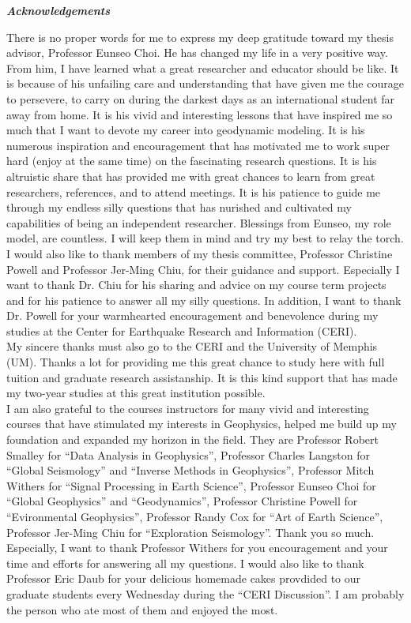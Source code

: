 \begin{center}
\textbf{\textit{Acknowledgements}}
\end{center}

There is no proper words for me to express my deep gratitude toward my thesis advisor, Professor Eunseo Choi. He has changed my life in a very positive way. From him, I have learned what a great researcher and educator should be like. It is because of his unfailing care and understanding that have given me the courage to persevere, to carry on during the darkest days as an international student far away from home. It is his vivid and interesting lessons that have inspired me so much that I want to devote my career into geodynamic modeling. It is his numerous inspiration and encouragement that has motivated me to work super hard (enjoy at the same time) on the fascinating research questions. It is his altruistic share that has provided me with great chances to learn from great researchers, references, and to attend meetings. It is his patience to guide me through my endless silly questions that has nurished and cultivated my capabilities of being an independent researcher. Blessings from Eunseo, my role model, are countless. I will keep them in mind and try my best to relay the torch.
\\
I would also like to thank members of my thesis committee, Professor Christine Powell and Professor Jer-Ming Chiu, for their guidance and support. Especially I want to thank Dr. Chiu for his sharing and advice on my course term projects and for his patience to answer all my silly questions. In addition, I want to thank Dr. Powell for your warmhearted encouragement and benevolence during my studies at the Center for Earthquake Research and Information (CERI). 
\\
My sincere thanks must also go to the CERI and the University of Memphis (UM). Thanks a lot for providing me this great chance to study here with full tuition and graduate research assistanship. It is this kind support that has made my two-year studies at this great institution possible. 
\\
I am also grateful to the courses instructors for many vivid and interesting courses that have stimulated my interests in Geophysics, helped me build up my foundation and expanded my horizon in the field. They are Professor Robert Smalley for ``Data Analysis in Geophysics'', Professor Charles Langston for ``Global Seismology'' and ``Inverse Methods in Geophysics'', Professor Mitch Withers for ``Signal Processing in Earth Science'', Professor Eunseo Choi for ``Global Geophysics'' and ``Geodynamics'', Professor Christine Powell for ``Evironmental Geophysics'', Professor Randy Cox for ``Art of Earth Science'', Professor Jer-Ming Chiu for ``Exploration Seismology''. Thank you so much. Especially, I want to thank Professor Withers for you encouragement and your time and efforts for answering all my questions. I would also like to thank Professor Eric Daub for your delicious homemade cakes provdided to our graduate students every Wednesday during the ``CERI Discussion''. I am probably the person who ate most of them and enjoyed the most.
